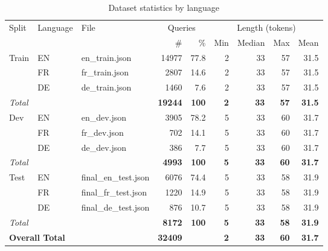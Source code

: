 \begin{table}[htbp]
	\centering
	\caption{Dataset statistics by language}
	\label{tab:query_stats}
	\begin{tabular}{l l l r r r r r r}
		\toprule
		\multirow{2}{*}{Split} & \multirow{2}{*}{Language} & \multirow{2}{*}{File}
		& \multicolumn{2}{c}{Queries}
		& \multicolumn{4}{c}{Length (tokens)} \\
		\cmidrule(lr){4-5} \cmidrule(lr){6-9}
		& & & \# & \% & Min & Median & Max & Mean \\
		\midrule

		\multirow{3}{*}{Train}
		& EN & en\_train.json & 14977 & 77.8 & 2 & 33 & 57 & 31.5 \\
		& FR & fr\_train.json & 2807  & 14.6 & 2 & 33 & 57 & 31.5 \\
		& DE & de\_train.json & 1460  & 7.6  & 2 & 33 & 57 & 31.5 \\
		\textit{Total} & & & \textbf{19244} & \textbf{100} & \textbf{2} & \textbf{33} & \textbf{57} & \textbf{31.5} \\

		\midrule

		\multirow{3}{*}{Dev}
		& EN & en\_dev.json & 3905 & 78.2 & 5 & 33 & 60 & 31.7 \\
		& FR & fr\_dev.json & 702  & 14.1 & 5 & 33 & 60 & 31.7 \\
		& DE & de\_dev.json & 386  & 7.7  & 5 & 33 & 60 & 31.7 \\
		\textit{Total} & & & \textbf{4993} & \textbf{100} & \textbf{5} & \textbf{33} & \textbf{60} & \textbf{31.7} \\

		\midrule

		\multirow{3}{*}{Test}
		& EN & final\_en\_test.json & 6076 & 74.4 & 5 & 33 & 58 & 31.9 \\
		& FR & final\_fr\_test.json & 1220 & 14.9 & 5 & 33 & 58 & 31.9 \\
		& DE & final\_de\_test.json & 876  & 10.7 & 5 & 33 & 58 & 31.9 \\
		\textit{Total} & & & \textbf{8172} & \textbf{100} & \textbf{5} & \textbf{33} & \textbf{58} & \textbf{31.9} \\

		\midrule

		\multicolumn{3}{l}{\textbf{Overall Total}}
		& \textbf{32409} & & \textbf{2} & \textbf{33} & \textbf{60} & \textbf{31.7} \\

		\bottomrule
	\end{tabular}

	\vspace{2mm}
\end{table}

